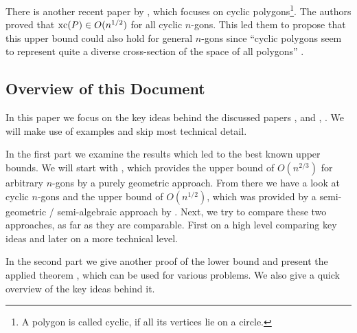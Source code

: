 There is another recent paper by \textcite{kwan2020extension}, which focuses on cyclic polygons\footnote{A polygon is called cyclic, if all its vertices lie on a circle.}. The authors proved that $\operatorname{xc}(P) \in O(n^{1/2})$ for all cyclic $n$-gons.
This led them to propose that this upper bound could also hold for general $n$-gons since ``cyclic polygons seem to represent quite a diverse cross-section of the space of all polygons'' \cite[p.\,3]{kwan2020extension}.



\subsection{Overview of this Document}

In this paper we focus on the key ideas behind the discussed papers , \textcite{shitov2020sublinear} and , \textcite{kwan2020extension}. We will make use of examples and skip most technical detail.

In the first part we examine the results which led to the best known upper bounds.
We will start with \textcite{shitov2020sublinear}, which provides the upper bound of $O(n^{2/3})$ for arbitrary $n$-gons by a purely geometric approach.
From there we have a look at cyclic $n$-gons and the upper bound of $O(n^{1/2})$, which was provided by a semi-geometric / semi-algebraic approach by \textcite{kwan2020extension}.
Next, we try to compare these two approaches, as far as they are comparable. First on a high level comparing key ideas and later on a more technical level.

In the second part we give another proof of the lower bound and present the applied theorem \cite[Theorem 1]{averkov2016maximum}, which can be used for various problems. We also give a quick overview of the key ideas behind it.
